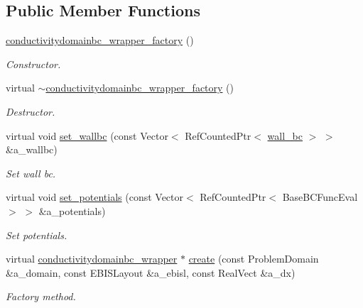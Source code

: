 \subsection*{Public Member Functions}
\begin{DoxyCompactItemize}
\item 
\hyperlink{classconductivitydomainbc__wrapper__factory_a232f293de3f55d0d76676dc4f0845dc2}{conductivitydomainbc\+\_\+wrapper\+\_\+factory} ()
\begin{DoxyCompactList}\small\item\em Constructor. \end{DoxyCompactList}\item 
virtual \hyperlink{classconductivitydomainbc__wrapper__factory_ad70133b4f742d4e1c9c7782fd33b78b8}{$\sim$conductivitydomainbc\+\_\+wrapper\+\_\+factory} ()
\begin{DoxyCompactList}\small\item\em Destructor. \end{DoxyCompactList}\item 
virtual void \hyperlink{classconductivitydomainbc__wrapper__factory_a7c8f02fc3422a6d860603de8b02a5a81}{set\+\_\+wallbc} (const Vector$<$ Ref\+Counted\+Ptr$<$ \hyperlink{classwall__bc}{wall\+\_\+bc} $>$ $>$ \&a\+\_\+wallbc)
\begin{DoxyCompactList}\small\item\em Set wall bc. \end{DoxyCompactList}\item 
virtual void \hyperlink{classconductivitydomainbc__wrapper__factory_a331d8538518e290ec6999f5e191694ae}{set\+\_\+potentials} (const Vector$<$ Ref\+Counted\+Ptr$<$ Base\+B\+C\+Func\+Eval $>$ $>$ \&a\+\_\+potentials)
\begin{DoxyCompactList}\small\item\em Set potentials. \end{DoxyCompactList}\item 
virtual \hyperlink{classconductivitydomainbc__wrapper}{conductivitydomainbc\+\_\+wrapper} $\ast$ \hyperlink{classconductivitydomainbc__wrapper__factory_ad8f02630752b64547fc156e805f6e02f}{create} (const Problem\+Domain \&a\+\_\+domain, const E\+B\+I\+S\+Layout \&a\+\_\+ebisl, const Real\+Vect \&a\+\_\+dx)
\begin{DoxyCompactList}\small\item\em Factory method. \end{DoxyCompactList}\end{DoxyCompactItemize}
